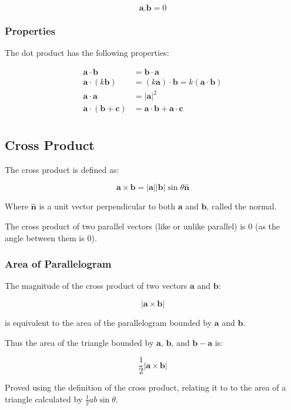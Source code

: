 \documentclass[a4paper,11pt]{article}
\newcommand{\bb}{\boldsymbol}
\begin{document}
$$
\bb{a} . \bb{b} = 0
$$


\subsubsection{Properties}

The dot product has the following properties:

$$
\begin{aligned}
	\bb{a} \cdot \bb{b} & = \bb{b} \cdot \bb{a} \\
	\bb{a} \cdot (k \bb{b}) & = (k \bb{a}) \cdot \bb{b} = k (\bb{a} \cdot \bb{b}) \\
	\bb{a} \cdot \bb{a} & = \lvert \bb{a} \rvert^2 \\
	\bb{a} \cdot (\bb{b} + \bb{c}) & = \bb{a} \cdot \bb{b} + \bb{a} \cdot \bb{c} \\
\end{aligned}
$$


\subsection{Cross Product}

The cross product is defined as:

$$
\bb{a} \times \bb{b} = \lvert \bb{a} \rvert \lvert \bb{b} \rvert \sin{\theta} \hat{\bb{n}}
$$

Where $\hat{\bb{n}}$ is a unit vector perpendicular to both $\bb{a}$ and
$\bb{b}$, called the normal.

The cross product of two parallel vectors (like or unlike parallel) is 0 (as
the angle between them is 0).


\subsubsection{Area of Parallelogram}

The magnitude of the cross product of two vectors $\bb{a}$ and $\bb{b}$:

$$
\lvert \bb{a} \times \bb{b} \rvert
$$

is equivalent to the area of the parallelogram bounded by $\bb{a}$ and $\bb{b}$.

Thus the area of the triangle bounded by $\bb{a}$, $\bb{b}$, and
$\bb{b} - \bb{a}$ is:

$$
\frac{1}{2} \lvert \bb{a} \times \bb{b} \rvert
$$

Proved using the definition of the cross product, relating it to to the area of
a triangle calculated by $\frac{1}{2} a b \sin{\theta}$.
\end{document}
